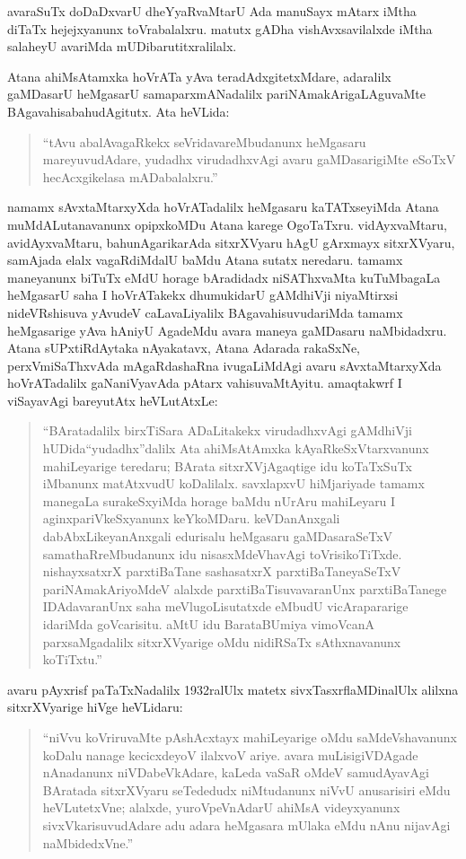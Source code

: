 avaraSuTx doDaDxvarU dheYyaRvaMtarU Ada manuSayx mAtarx iMtha diTaTx hejejxyanunx toVrabalalxru. matutx gADha vishAvxsavilalxde iMtha salaheyU avariMda mUDibarutitxralilalx.

Atana ahiMsAtamxka hoVrATa yAva teradAdxgitetxMdare, adaralilx gaMDasarU heMgasarU samaparxmANadalilx pariNAmakArigaLAguvaMte BAgavahisabahudAgitutx. Ata heVLida:
\begin{quote}
``tAvu abalAvagaRkekx seVridavareMbudanunx heMgasaru mareyuvudAdare, yudadhx virudadhxvAgi avaru gaMDasarigiMte eSoTxV hecAcxgi\break kelasa mADabalalxru.''
\end{quote}

namamx sAvxtaMtarxyXda hoVrATadalilx heMgasaru kaTATxseyiMda Atana muMdALutana\-vanunx opipxkoMDu Atana karege OgoTaTxru. vidAyxvaMtaru, avidAyxvaMtaru, bahunAgarikarAda sitxrXVyaru hAgU gArxmayx sitxrXVyaru, samAjada elalx vagaRdiMdalU baMdu Atana sutatx neredaru. tamamx maneyanunx biTuTx eMdU horage bAradidadx niSAThxvaMta kuTuMbagaLa heMgasarU saha I hoVrATakekx dhumukidarU gAMdhiVji niyaMtirxsi nideVRshisuva yAvudeV caLavaLiyalilx BAgavahisuvudariMda tamamx heMgasarige yAva hAniyU AgadeMdu avara maneya gaMDasaru naMbidadxru. Atana sUPxtiRdAytaka nAyakatavx, Atana Adarada rakaSxNe, perxVmiSaThxvAda mAgaRdashaRna ivugaLiMdAgi avaru sAvxtaMtarxyXda hoVrATadalilx gaNaniVyavAda pAtarx vahisuvaMtAyitu. amaqtakwrf I viSayavAgi bareyutAtx heVLutAtxLe:
\begin{quote}
``BAratadalilx birxTiSara ADaLitakekx virudadhxvAgi gAMdhiVji hUDida\break ``yudadhx''dalilx Ata ahiMsAtAmxka kAyaRkeSxVtarxvanunx mahiLeyarige tere\-daru; BArata sitxrXVjAgaqtige idu koTaTxSuTx iMbanunx matAtxvudU koDa\-lilalx. savxlapxvU hiMjariyade tamamx manegaLa surakeSxyiMda horage baMdu nUrAru mahiLeyaru I aginxpariVkeSxyanunx keYkoMDaru. keVDanAnxgali dabAbxLikeyanAnxgali edurisalu heMgasaru gaMDasaraSeTxV samathaR\-reMbu\-danunx idu nisasxMdeVhavAgi toVrisikoTiTxde. nishayxsatxrX parxtiBaTane sashasatxrX parxtiBaTaneyaSeTxV pariNAmakAriyoMdeV alalxde parxti\-BaTisuvavaranUnx parxtiBaTanege IDAdavaranUnx saha meVlugoLisutatxde eMbudU vicArapararige idariMda goVcarisitu. aMtU idu BarataBUmiya vimoVcanA parxsaMgadalilx sitxrXVyarige oMdu nidiRSaTx sAthxnavanunx koTiTxtu.''
\end{quote}

avaru pAyxrisf paTaTxNadalilx {\rm 1932}ralUlx matetx sivxTasxrflaMDinalUlx alilxna sitxrXVyarige hiVge heVLidaru:
\begin{quote}
``niVvu koVriruvaMte pAshAcxtayx mahiLeyarige oMdu saMdeVshavanunx koDalu nanage kecicxdeyoV ilalxvoV ariye. avara muLisigiVDAgade nAnadanunx niVDabeVkAdare, kaLeda vaSaR oMdeV samudAyavAgi BAratada sitxrXVyaru seTededudx niMtudanunx niVvU anusarisiri eMdu heVLutetxVne; alalxde, yuroVpeVnAdarU ahiMsA videyxyanunx sivxVkarisuvudAdare adu adara heMgasara mUlaka eMdu nAnu nijavAgi naMbidedxVne.''
\end{quote}

